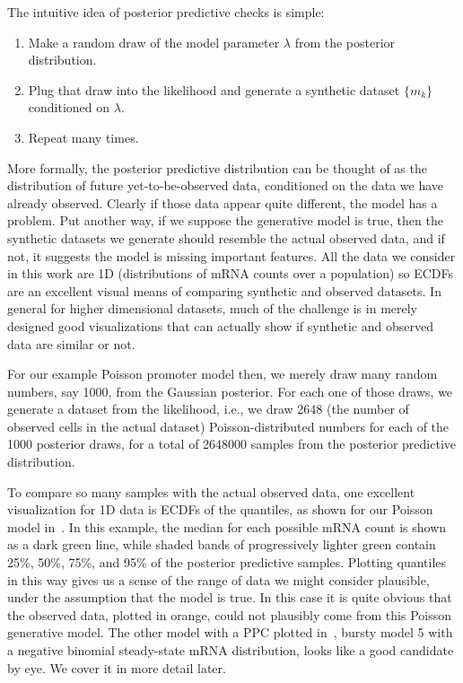 The intuitive idea of posterior predictive checks is simple: 
\begin{enumerate}
\item Make a random draw of the model parameter $\lambda$ from the posterior
distribution.
\item Plug that draw into the likelihood and generate a synthetic dataset
$\{m_k\}$ conditioned on $\lambda$.
\item Repeat many times.
\end{enumerate}
More formally, the posterior predictive distribution can be thought of as the
distribution of future yet-to-be-observed data, conditioned on the data we have
already observed. Clearly if those data appear quite different, the model has a
problem. Put another way, if we suppose the generative model is true, then the
synthetic datasets we generate should resemble the actual observed data, and if
not, it suggests the model is missing important features. All the data we
consider in this work are 1D (distributions of mRNA counts over a population) so
ECDFs are an excellent visual means of comparing synthetic and observed
datasets. In general for higher dimensional datasets, much of the challenge is
in merely designed good visualizations that can actually show if synthetic and
observed data are similar or not.

For our example Poisson promoter model then, we merely draw many random numbers,
say 1000, from the Gaussian posterior. For each one of those draws, we generate
a dataset from the likelihood, i.e., we draw 2648 (the number of observed cells
in the actual dataset) Poisson-distributed numbers for each of the 1000
posterior draws, for a total of 2648000 samples from the posterior predictive
distribution.

To compare so many samples with the actual observed data, one excellent
visualization for 1D data is ECDFs of the quantiles, as shown for our Poisson
model in~. In this example, the median for each possible mRNA
count is shown as a dark green line, while shaded bands of progressively lighter
green contain 25\%, 50\%, 75\%, and 95\% of the posterior predictive samples.
Plotting quantiles in this way gives us a sense of the range of data we might
consider plausible, under the assumption that the model is true. In this case it
is quite obvious that the observed data, plotted in orange, could not plausibly
come from this Poisson generative model. The other model with a PPC plotted
in~, bursty model 5 with a negative binomial steady-state mRNA
distribution, looks like a good candidate by eye. We cover it in more detail
later.

